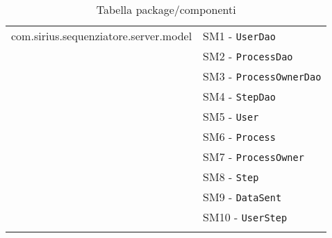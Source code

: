 \begin{longtable}{XX}
com.sirius.sequenziatore.server.model
&SM1 - \texttt{UserDao}\\
&SM2 - \texttt{ProcessDao}\\
&SM3 - \texttt{ProcessOwnerDao}\\
&SM4 - \texttt{StepDao}\\
&SM5 - \texttt{User}\\
&SM6 - \texttt{Process}\\
&SM7 - \texttt{ProcessOwner}\\
&SM8 - \texttt{Step}\\
&SM9 - \texttt{DataSent}\\
&SM10 - \texttt{UserStep}\\
\midrule

\bottomrule
\caption{Tabella package/componenti}
\end{longtable}
